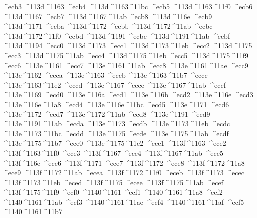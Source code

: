 \checkit ^^^^ecb3 ^^^^113d^^^^1163
\checkit ^^^^ecb4 ^^^^113d^^^^1163^^^^11bc
\checkit ^^^^ecb5 ^^^^113d^^^^1163^^^^11f0
\checkit ^^^^ecb6 ^^^^113d^^^^1167
\checkit ^^^^ecb7 ^^^^113d^^^^1167^^^^11ab
\checkit ^^^^ecb8 ^^^^113d^^^^116e
\checkit ^^^^ecb9 ^^^^113d^^^^1171
\checkit ^^^^ecba ^^^^113d^^^^1172
\checkit ^^^^ecbb ^^^^113d^^^^1172^^^^11ab
\checkit ^^^^ecbc ^^^^113d^^^^1172^^^^11f0
\checkit ^^^^ecbd ^^^^113d^^^^1191
\checkit ^^^^ecbe ^^^^113d^^^^1191^^^^11ab
\checkit ^^^^ecbf ^^^^113d^^^^1194
\checkit ^^^^ecc0 ^^^^113d^^^^1173
\checkit ^^^^ecc1 ^^^^113d^^^^1173^^^^11eb
\checkit ^^^^ecc2 ^^^^113d^^^^1175
\checkit ^^^^ecc3 ^^^^113d^^^^1175^^^^11ab
\checkit ^^^^ecc4 ^^^^113d^^^^1175^^^^11eb
\checkit ^^^^ecc5 ^^^^113d^^^^1175^^^^11f9
\checkit ^^^^ecc6 ^^^^113e^^^^1161
\checkit ^^^^ecc7 ^^^^113e^^^^1161^^^^11ab
\checkit ^^^^ecc8 ^^^^113e^^^^1161^^^^11ae
\checkit ^^^^ecc9 ^^^^113e^^^^1162
\checkit ^^^^ecca ^^^^113e^^^^1163
\checkit ^^^^eccb ^^^^113e^^^^1163^^^^11b7
\checkit ^^^^eccc ^^^^113e^^^^1163^^^^11e2
\checkit ^^^^eccd ^^^^113e^^^^1167
\checkit ^^^^ecce ^^^^113e^^^^1167^^^^11ab
\checkit ^^^^eccf ^^^^113e^^^^1169
\checkit ^^^^ecd0 ^^^^113e^^^^116a
\checkit ^^^^ecd1 ^^^^113e^^^^116b
\checkit ^^^^ecd2 ^^^^113e^^^^116e
\checkit ^^^^ecd3 ^^^^113e^^^^116e^^^^11a8
\checkit ^^^^ecd4 ^^^^113e^^^^116e^^^^11bc
\checkit ^^^^ecd5 ^^^^113e^^^^1171
\checkit ^^^^ecd6 ^^^^113e^^^^1172
\checkit ^^^^ecd7 ^^^^113e^^^^1172^^^^11ab
\checkit ^^^^ecd8 ^^^^113e^^^^1191
\checkit ^^^^ecd9 ^^^^113e^^^^1191^^^^11ab
\checkit ^^^^ecda ^^^^113e^^^^1173
\checkit ^^^^ecdb ^^^^113e^^^^1173^^^^11eb
\checkit ^^^^ecdc ^^^^113e^^^^1173^^^^11bc
\checkit ^^^^ecdd ^^^^113e^^^^1175
\checkit ^^^^ecde ^^^^113e^^^^1175^^^^11ab
\checkit ^^^^ecdf ^^^^113e^^^^1175^^^^11b7
\checkit ^^^^ece0 ^^^^113e^^^^1175^^^^11e2
\checkit ^^^^ece1 ^^^^113f^^^^1163
\checkit ^^^^ece2 ^^^^113f^^^^1163^^^^11f0
\checkit ^^^^ece3 ^^^^113f^^^^1167
\checkit ^^^^ece4 ^^^^113f^^^^1167^^^^11ab
\checkit ^^^^ece5 ^^^^113f^^^^116e
\checkit ^^^^ece6 ^^^^113f^^^^1171
\checkit ^^^^ece7 ^^^^113f^^^^1172
\checkit ^^^^ece8 ^^^^113f^^^^1172^^^^11a8
\checkit ^^^^ece9 ^^^^113f^^^^1172^^^^11ab
\checkit ^^^^ecea ^^^^113f^^^^1172^^^^11f0
\checkit ^^^^eceb ^^^^113f^^^^1173
\checkit ^^^^ecec ^^^^113f^^^^1173^^^^11eb
\checkit ^^^^eced ^^^^113f^^^^1175
\checkit ^^^^ecee ^^^^113f^^^^1175^^^^11ab
\checkit ^^^^ecef ^^^^113f^^^^1175^^^^11f9
\checkit ^^^^ecf0 ^^^^1140^^^^1161
\checkit ^^^^ecf1 ^^^^1140^^^^1161^^^^11a8
\checkit ^^^^ecf2 ^^^^1140^^^^1161^^^^11ab
\checkit ^^^^ecf3 ^^^^1140^^^^1161^^^^11ae
\checkit ^^^^ecf4 ^^^^1140^^^^1161^^^^11af
\checkit ^^^^ecf5 ^^^^1140^^^^1161^^^^11b7
